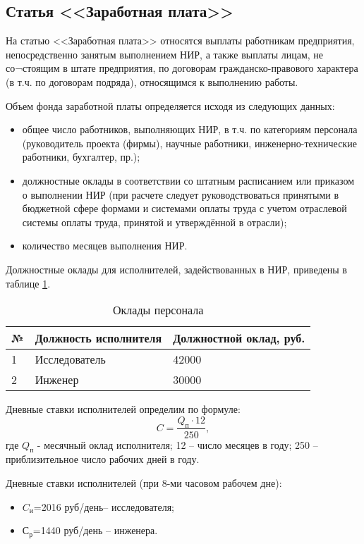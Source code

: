 \subsection{Статья <<Заработная плата>>}

На статью <<Заработная плата>> относятся выплаты работникам предприятия, непосредственно занятым выполнением НИР, а также выплаты лицам, не со¬стоящим в штате предприятия, по договорам гражданско-правового характера (в т.ч. по договорам подряда), относящимся к выполнению работы.

Объем фонда заработной платы определяется исходя из следующих данных:
\begin{itemize}
\item общее число работников, выполняющих НИР, в т.ч. по категориям персонала (руководитель проекта (фирмы), научные работники, инженерно-технические работники, бухгалтер, пр.);
\item должностные оклады в соответствии со штатным расписанием или приказом о выполнении НИР (при расчете следует руководствоваться принятыми в бюджетной сфере формами и системами оплаты труда с учетом отраслевой системы оплаты труда, принятой и утверждённой в отрасли);
\item количество месяцев выполнения НИР.
\end{itemize}

Должностные оклады для исполнителей, задействованных в НИР, приведены в таблице \ref{tab:econ_grades}.
\begin{table}[h]
	\begin{center}
		\caption{Оклады персонала}
		\begin{tabular}{|l|l|l|}
		\hline
№ & Должность исполнителя & Должностной оклад, руб. \\ \hline
1 & Исследователь & 42000 \\ \hline
2 & Инженер & 30000 \\ \hline
		\end{tabular}
		\label{tab:econ_grades}
	\end{center}
\end{table}

Дневные ставки исполнителей определим по формуле: $$C=\dfrac{Q_\text{п}\cdot12}{250},$$ где
$Q_\text{п}$ - месячный оклад исполнителя;
12 – число месяцев в году;
250 – приблизительное число рабочих дней в году.

Дневные ставки исполнителей (при 8-ми часовом рабочем дне): 
\begin{itemize}
	\item $C_\text{и}$=2016 руб/день– исследователя;
	\item $С_\text{р}$=1440 руб/день – инженера.
\end{itemize}


